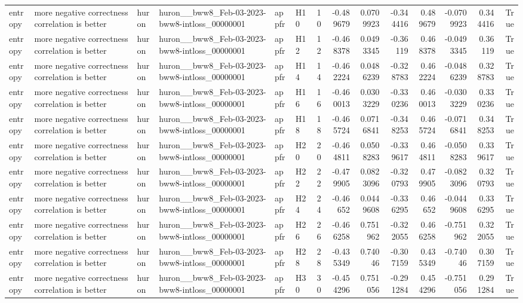 \begin{longtable}{llllllrrrrrrrr}
entropy & more negative correctness correlation is better & huron & huron\_\_bww8\_Feb-03-2023-bww8-intloss\_00000001 & appfr & H10 & 10 & -0.489679 & 0.0709923 & -0.344416 & 0.489679 & -0.0709923 & 0.344416 & True \\
entropy & more negative correctness correlation is better & huron & huron\_\_bww8\_Feb-03-2023-bww8-intloss\_00000001 & appfr & H12 & 12 & -0.468378 & 0.0493345 & -0.36119 & 0.468378 & -0.0493345 & 0.36119 & True \\
entropy & more negative correctness correlation is better & huron & huron\_\_bww8\_Feb-03-2023-bww8-intloss\_00000001 & appfr & H14 & 14 & -0.462224 & 0.0486239 & -0.328783 & 0.462224 & -0.0486239 & 0.328783 & True \\
entropy & more negative correctness correlation is better & huron & huron\_\_bww8\_Feb-03-2023-bww8-intloss\_00000001 & appfr & H16 & 16 & -0.460013 & 0.0303229 & -0.330236 & 0.460013 & -0.0303229 & 0.330236 & True \\
entropy & more negative correctness correlation is better & huron & huron\_\_bww8\_Feb-03-2023-bww8-intloss\_00000001 & appfr & H18 & 18 & -0.465724 & 0.0716841 & -0.348253 & 0.465724 & -0.0716841 & 0.348253 & True \\
entropy & more negative correctness correlation is better & huron & huron\_\_bww8\_Feb-03-2023-bww8-intloss\_00000001 & appfr & H20 & 20 & -0.464811 & 0.0508283 & -0.339617 & 0.464811 & -0.0508283 & 0.339617 & True \\
entropy & more negative correctness correlation is better & huron & huron\_\_bww8\_Feb-03-2023-bww8-intloss\_00000001 & appfr & H22 & 22 & -0.479905 & 0.0823096 & -0.320793 & 0.479905 & -0.0823096 & 0.320793 & True \\
entropy & more negative correctness correlation is better & huron & huron\_\_bww8\_Feb-03-2023-bww8-intloss\_00000001 & appfr & H24 & 24 & -0.46652 & 0.0449608 & -0.336295 & 0.46652 & -0.0449608 & 0.336295 & True \\
entropy & more negative correctness correlation is better & huron & huron\_\_bww8\_Feb-03-2023-bww8-intloss\_00000001 & appfr & H26 & 26 & -0.466258 & 0.751962 & -0.322055 & 0.466258 & -0.751962 & 0.322055 & True \\
entropy & more negative correctness correlation is better & huron & huron\_\_bww8\_Feb-03-2023-bww8-intloss\_00000001 & appfr & H28 & 28 & -0.435349 & 0.74046 & -0.307159 & 0.435349 & -0.74046 & 0.307159 & True \\
entropy & more negative correctness correlation is better & huron & huron\_\_bww8\_Feb-03-2023-bww8-intloss\_00000001 & appfr & H30 & 30 & -0.454296 & 0.751056 & -0.291284 & 0.454296 & -0.751056 & 0.291284 & True \\

\end{longtable}

